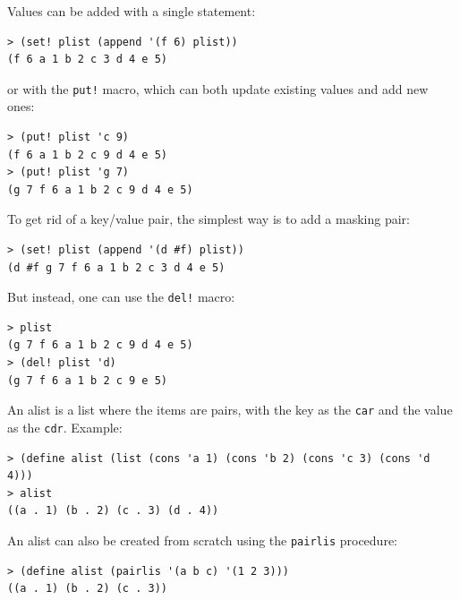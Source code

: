\documentclass[twoside,9pt]{report}
\begin{document}
Values can be added with a single statement:

\noindent\makebox[\linewidth]{\rule{\linewidth}{0.4pt}}
\begin{lstlisting}
> (set! plist (append '(f 6) plist))
(f 6 a 1 b 2 c 3 d 4 e 5)
\end{lstlisting}
\noindent\makebox[\linewidth]{\rule{\linewidth}{0.4pt}}

or with the \texttt{put!} macro, which can both update existing values and add new ones:

\noindent\makebox[\linewidth]{\rule{\linewidth}{0.4pt}}
\begin{lstlisting}
> (put! plist 'c 9)
(f 6 a 1 b 2 c 9 d 4 e 5)
> (put! plist 'g 7)
(g 7 f 6 a 1 b 2 c 9 d 4 e 5)
\end{lstlisting}
\noindent\makebox[\linewidth]{\rule{\linewidth}{0.4pt}}

To get rid of a key/value pair, the simplest way is to add a masking pair:

\noindent\makebox[\linewidth]{\rule{\linewidth}{0.4pt}}
\begin{lstlisting}
> (set! plist (append '(d #f) plist))
(d #f g 7 f 6 a 1 b 2 c 3 d 4 e 5)
\end{lstlisting}
\noindent\makebox[\linewidth]{\rule{\linewidth}{0.4pt}}

But instead, one can use the \texttt{del!} macro:

\noindent\makebox[\linewidth]{\rule{\linewidth}{0.4pt}}
\begin{lstlisting}
> plist
(g 7 f 6 a 1 b 2 c 9 d 4 e 5)
> (del! plist 'd)
(g 7 f 6 a 1 b 2 c 9 e 5)
\end{lstlisting}
\noindent\makebox[\linewidth]{\rule{\linewidth}{0.4pt}}

An alist is a list where the items are pairs, with the key as the \texttt{car} and the value as the \texttt{cdr}. Example:

\noindent\makebox[\linewidth]{\rule{\linewidth}{0.4pt}}
\begin{lstlisting}
> (define alist (list (cons 'a 1) (cons 'b 2) (cons 'c 3) (cons 'd 4)))
> alist
((a . 1) (b . 2) (c . 3) (d . 4))
\end{lstlisting}
\noindent\makebox[\linewidth]{\rule{\linewidth}{0.4pt}}

An alist can also be created from scratch using the \texttt{pairlis} procedure:

\noindent\makebox[\linewidth]{\rule{\linewidth}{0.4pt}}
\begin{lstlisting}
> (define alist (pairlis '(a b c) '(1 2 3)))
((a . 1) (b . 2) (c . 3))
\end{lstlisting}
\noindent\makebox[\linewidth]{\rule{\linewidth}{0.4pt}}
\end{document}
